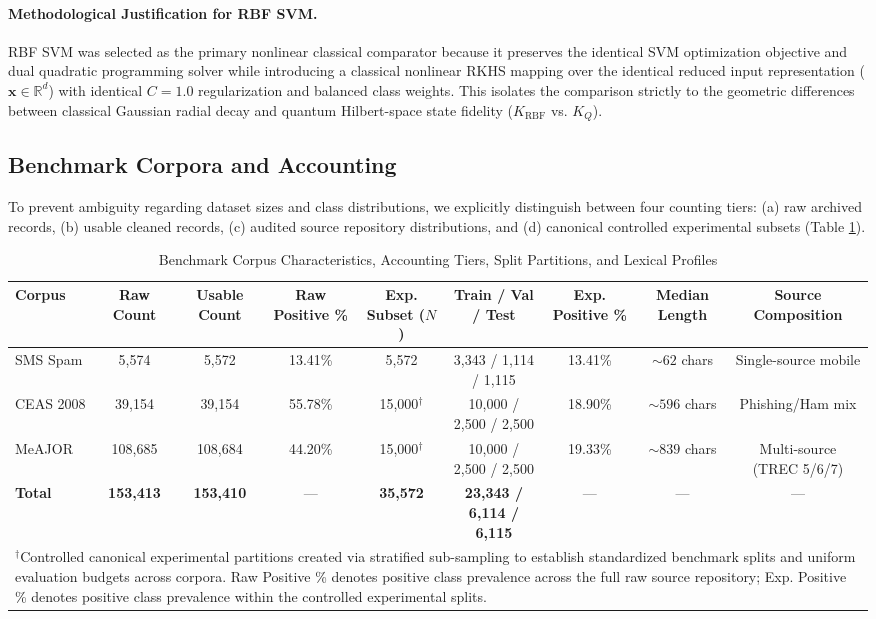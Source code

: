 \documentclass[10pt,twocolumn,letterpaper]{article}
\begin{document}
\paragraph{Methodological Justification for RBF SVM.} RBF SVM was selected as the primary nonlinear classical comparator because it preserves the identical SVM optimization objective and dual quadratic programming solver while introducing a classical nonlinear RKHS mapping over the identical reduced input representation ($\mathbf{x} \in \mathbb{R}^d$) with identical $C=1.0$ regularization and balanced class weights. This isolates the comparison strictly to the geometric differences between classical Gaussian radial decay and quantum Hilbert-space state fidelity ($K_{\text{RBF}}$ vs. $K_Q$).

\subsection{Benchmark Corpora and Accounting}
To prevent ambiguity regarding dataset sizes and class distributions, we explicitly distinguish between four counting tiers: (a) raw archived records, (b) usable cleaned records, (c) audited source repository distributions, and (d) canonical controlled experimental subsets (Table \ref{tab:dataset_characteristics}).

\begin{table}[t]
\centering
\scriptsize
\caption{Benchmark Corpus Characteristics, Accounting Tiers, Split Partitions, and Lexical Profiles}
\label{tab:dataset_characteristics}
\setlength{\tabcolsep}{2.5pt}
\begin{tabular}{lcccccccc}
\toprule
Corpus & Raw Count & Usable Count & Raw Positive \% & Exp. Subset ($N$) & Train / Val / Test & Exp. Positive \% & Median Length & Source Composition \\
\midrule
SMS Spam & 5,574 & 5,572 & 13.41\% & 5,572 & 3,343 / 1,114 / 1,115 & 13.41\% & $\sim 62$ chars & Single-source mobile \\
CEAS 2008 & 39,154 & 39,154 & 55.78\% & 15,000$^\dagger$ & 10,000 / 2,500 / 2,500 & 18.90\% & $\sim 596$ chars & Phishing/Ham mix \\
MeAJOR & 108,685 & 108,684 & 44.20\% & 15,000$^\dagger$ & 10,000 / 2,500 / 2,500 & 19.33\% & $\sim 839$ chars & Multi-source (TREC 5/6/7) \\
\midrule
\textbf{Total} & \textbf{153,413} & \textbf{153,410} & — & \textbf{35,572} & \textbf{23,343 / 6,114 / 6,115} & — & — & — \\
\midrule
\multicolumn{9}{p{0.95\textwidth}}{\scriptsize{$^\dagger$Controlled canonical experimental partitions created via stratified sub-sampling to establish standardized benchmark splits and uniform evaluation budgets across corpora. Raw Positive \% denotes positive class prevalence across the full raw source repository; Exp. Positive \% denotes positive class prevalence within the controlled experimental splits.}} \\
\bottomrule
\end{tabular}
\end{table}
\end{document}
